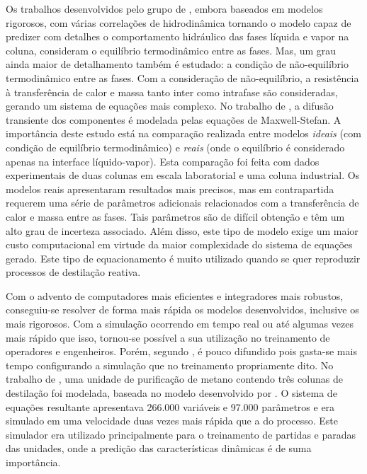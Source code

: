 Os trabalhos desenvolvidos pelo grupo de , embora baseados em modelos rigorosos, com
várias correlações de hidrodinâmica tornando o modelo capaz de predizer com detalhes o comportamento hidráulico
das fases líquida e vapor na coluna, consideram o equilíbrio termodinâmico
entre as fases.
Mas, um grau ainda maior de detalhamento também é estudado: a condição de não-equilíbrio termodinâmico entre as fases.
Com a consideração de não-equilíbrio,
a resistência à transferência de calor e massa tanto inter como intrafase são
consideradas, gerando um sistema de equações mais complexo. No trabalho de
, a difusão transiente dos componentes é modelada pelas equações de Maxwell-Stefan.
A importância deste estudo está na comparação realizada entre modelos \emph{ideais} (com condição de equilíbrio
termodinâmico) e \emph{reais} (onde o equilíbrio é considerado apenas na interface líquido-vapor). Esta comparação
foi feita com dados experimentais de duas colunas em escala laboratorial e uma coluna industrial.
Os modelos reais apresentaram resultados mais precisos, mas em contrapartida requerem uma série de parâmetros
adicionais relacionados com a transferência de calor e massa entre as fases. Tais parâmetros são de difícil
obtenção e têm um alto grau de incerteza associado. Além disso, este tipo de modelo exige um maior custo
computacional em virtude da maior complexidade do sistema de equações gerado. Este tipo de equacionamento
é muito utilizado quando se quer reproduzir processos de destilação reativa.

Com o advento de computadores mais eficientes e integradores mais robustos, conseguiu-se resolver de forma mais
rápida os modelos desenvolvidos, inclusive os mais rigorosos.
Com a simulação ocorrendo em tempo real ou até algumas vezes mais rápido que isso, tornou-se possível a sua
utilização no treinamento de operadores e engenheiros. Porém, segundo , é pouco difundido
pois gasta-se mais tempo configurando a simulação que no treinamento propriamente dito.
No trabalho de , uma unidade de purificação de metano contendo três colunas de destilação
foi modelada, baseada no modelo desenvolvido por .
O sistema de equações resultante apresentava 266.000 variáveis e 97.000 parâmetros e era simulado em uma velocidade
duas vezes mais rápida que a do processo.
Este simulador era utilizado principalmente para o treinamento de partidas e paradas das unidades, onde a predição
das características dinâmicas é de suma importância.


